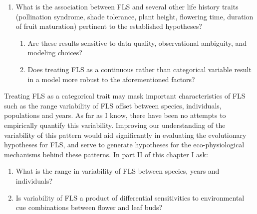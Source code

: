 \documentclass[12pt]{article}\usepackage[]{graphicx}\usepackage[]{color}
\begin{document}
\begin{enumerate}
\item  What is the association between FLS and several other life history traits (pollination syndrome, shade tolerance, plant height, flowering time, duration of fruit maturation) pertinent to the established hypotheses? 
\begin{enumerate}
\item Are these results sensitive to data quality, observational ambiguity, and modeling choices? 
\item Does treating FLS as a continuous rather than categorical variable result in a model more robust to the aforementioned factors?
\end{enumerate}
\end{enumerate}
\indent\indent Treating FLS as a categorical trait may mask important characteristics of FLS such as the range variability of FLS offset between species, individuals, populations and years. As far as I know, there have been no attempts to empirically quantify this variability. Improving our understanding of the variability of this pattern would aid significantly in evaluating the evolutionary hypotheses for FLS, and serve to generate hypotheses for the eco-physiological mechanisms behind these patterns. In part II of this chapter I ask:
\begin{enumerate}
\item What is the range in variability of FLS between species, years and individuals?
\item Is variability of FLS a product of differential sensitivities to environmental cue combinations between flower and leaf buds?
\end{enumerate}
\end{document}
